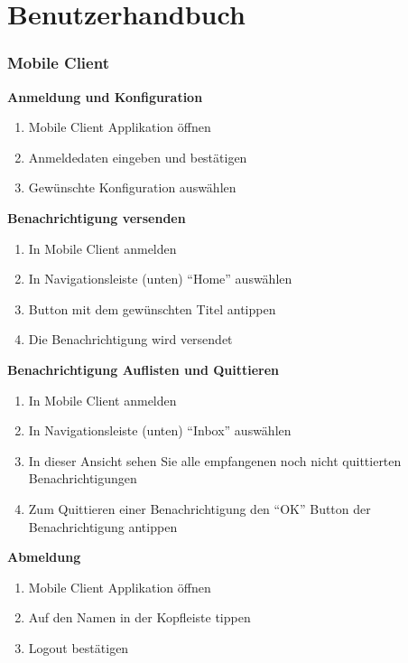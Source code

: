 \section{Benutzerhandbuch}

\subsubsection*{Mobile Client}

\textbf{Anmeldung und Konfiguration}

\begin{enumerate}
    \item Mobile Client Applikation öffnen
    \item Anmeldedaten eingeben und bestätigen
    \item Gewünschte Konfiguration auswählen
\end{enumerate}

\textbf{Benachrichtigung versenden}

\begin{enumerate}
    \item In Mobile Client anmelden
    \item In Navigationsleiste (unten) ``Home'' auswählen
    \item Button mit dem gewünschten Titel antippen
    \item Die Benachrichtigung wird versendet
\end{enumerate}

\textbf{Benachrichtigung Auflisten und Quittieren}

\begin{enumerate}
    \item In Mobile Client anmelden
    \item In Navigationsleiste (unten) ``Inbox'' auswählen
    \item In dieser Ansicht sehen Sie alle empfangenen noch nicht quittierten Benachrichtigungen
    \item Zum Quittieren einer Benachrichtigung den ``OK'' Button der Benachrichtigung antippen
\end{enumerate}

\textbf{Abmeldung}

\begin{enumerate}
    \item Mobile Client Applikation öffnen
    \item Auf den Namen in der Kopfleiste tippen
    \item Logout bestätigen
\end{enumerate}

